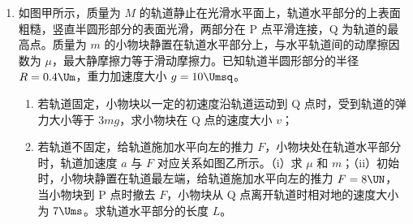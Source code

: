 \documentclass[\gkver]{gaokaozhenti}
\begin{document}
\begin{enumerate}
\item
如图甲所示，质量为 $M$ 的轨道静止在光滑水平面上，轨道水平部分的上表面粗糙，竖直半圆形部分的表面光滑，两部分在 P 点平滑连接，Q 为轨道的最高点。质量为 $m$ 的小物块静置在轨道水平部分上，与水平轨道间的动摩擦因数为 $\mu$，最大静摩擦力等于滑动摩擦力。已知轨道半圆形部分的半径 $R = 0.4 \Um$，重力加速度大小 $g = 10 \Umsq$。
\begin{enumerate}
	\item
	若轨道固定，小物块以一定的初速度沿轨道运动到 Q 点时，受到轨道的弹力大小等于 $3mg$，求小物块在 Q 点的速度大小 $v$；
	\item
	若轨道不固定，给轨道施加水平向左的推力 $F$，小物块处在轨道水平部分时，轨道加速度 $a$ 与 $F$ 对应关系如图乙所示。（i）求 $\mu$ 和 $m$；（ii）初始时，小物块静置在轨道最左端，给轨道施加水平向左的推力 $F = 8 \UN$，当小物块到 P 点时撤去 $F$，小物块从 Q 点离开轨道时相对地的速度大小为 $7 \Ums$。求轨道水平部分的长度 $L$。
\end{enumerate}
\end{enumerate}
\end{document}
